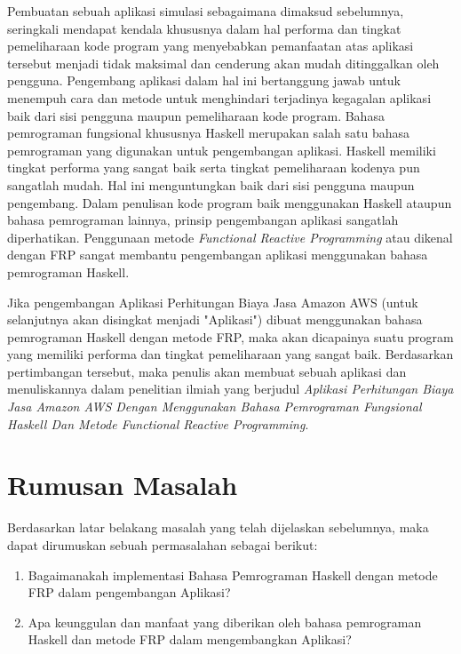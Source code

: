 \documentclass[pi.tex]{subfile}
\begin{document}
Pembuatan sebuah aplikasi simulasi sebagaimana dimaksud sebelumnya, seringkali mendapat kendala khususnya dalam hal performa dan tingkat pemeliharaan kode program yang menyebabkan pemanfaatan atas aplikasi tersebut menjadi tidak maksimal dan cenderung akan mudah ditinggalkan oleh pengguna. Pengembang aplikasi dalam hal ini bertanggung jawab untuk menempuh cara dan metode untuk menghindari terjadinya kegagalan aplikasi baik dari sisi pengguna maupun pemeliharaan kode program. Bahasa pemrograman fungsional khususnya Haskell merupakan salah satu bahasa pemrograman yang digunakan untuk pengembangan aplikasi. Haskell memiliki tingkat performa yang sangat baik serta tingkat pemeliharaan kodenya pun sangatlah mudah. Hal ini menguntungkan baik dari sisi pengguna maupun pengembang. Dalam penulisan kode program baik menggunakan Haskell ataupun bahasa pemrograman lainnya, prinsip pengembangan aplikasi sangatlah diperhatikan. Penggunaan metode \emph{Functional Reactive Programming} atau dikenal dengan FRP sangat membantu pengembangan aplikasi menggunakan bahasa pemrograman Haskell.

Jika pengembangan Aplikasi Perhitungan Biaya Jasa Amazon AWS (untuk selanjutnya akan disingkat menjadi "Aplikasi") dibuat menggunakan bahasa pemrograman Haskell dengan metode FRP, maka akan dicapainya suatu program yang memiliki performa dan tingkat pemeliharaan yang sangat baik. Berdasarkan pertimbangan tersebut, maka penulis akan membuat sebuah aplikasi dan menuliskannya dalam penelitian ilmiah yang berjudul \emph{Aplikasi Perhitungan Biaya Jasa Amazon AWS Dengan Menggunakan Bahasa Pemrograman Fungsional Haskell Dan Metode Functional Reactive Programming}.

\section{Rumusan Masalah}
Berdasarkan latar belakang masalah yang telah dijelaskan sebelumnya, maka dapat dirumuskan sebuah permasalahan sebagai berikut:
\begin{enumerate}
  \item Bagaimanakah implementasi Bahasa Pemrograman Haskell dengan metode FRP dalam pengembangan Aplikasi?
  \item Apa keunggulan dan manfaat yang diberikan oleh bahasa pemrograman Haskell dan metode FRP dalam mengembangkan Aplikasi?
\end{enumerate}
\end{document}
